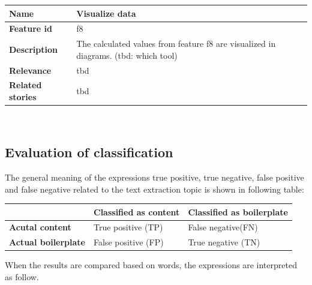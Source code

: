 
	\begin{tabular}{ | p{3cm} | p{12cm} |}
	\hline
	\textbf{Name} 				& Visualize data \\ \hline
	\textbf{Feature id} 		& f8 \\ \hline
	\textbf{Description} 		& The calculated values from feature f8 are visualized in diagrams. (tbd: which tool)\\ \hline
	\textbf{Relevance} 			& tbd\\ \hline
	\textbf{Related stories} 	& tbd \\ \hline
	\end{tabular} \\


\subsection{Evaluation of classification}
\label{subsec:Evaluation of classification}


The general meaning of the expressions true positive, true negative, false positive and false negative related to the text extraction topic is shown in following table:

\begin{table}[h]
\begin{tabular}{|p{4cm} |p{5.5cm} |p{5.5cm} |}\hline
          								& \textbf{Classified as content} 	& \textbf{Classified as boilerplate} 	\\ \hline
\textbf{Acutal content} 				& True positive (TP)				& False negative(FN)					\\ \hline
\textbf{Actual boilerplate} 			& False positive (FP)       		& True negative (TN)				 	\\ \hline
\end{tabular}
\end{table}

When the results are compared based on words, the expressions are interpreted as follow.

